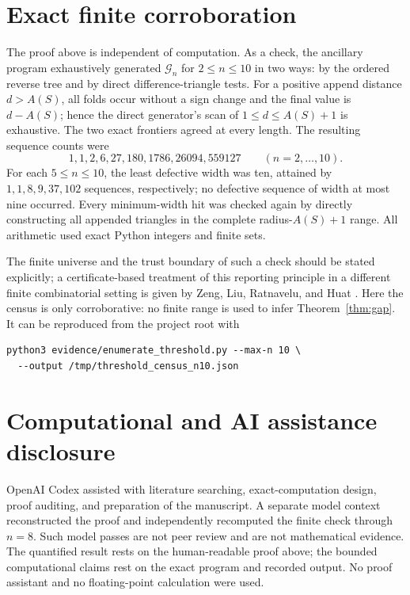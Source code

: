 \documentclass[11pt]{article}
\theoremstyle{remark}
\newcommand{\G}{\mathcal G}
\begin{document}
\section{Exact finite corroboration}

The proof above is independent of computation.  As a check, the ancillary
program  exhaustively generated $\G_n$ for
$2\le n\le10$ in two ways: by the ordered reverse tree and by direct
difference-triangle tests.  For a positive append distance $d>A(S)$, all
folds occur without a sign change and the final value is $d-A(S)$; hence the
direct generator's scan of $1\le d\le A(S)+1$ is exhaustive.  The two exact
frontiers agreed at every length.  The resulting sequence counts were
\[
 1,1,2,6,27,180,1786,26094,559127
 \qquad(n=2,\ldots,10).
\]
For each $5\le n\le10$, the least defective width was ten, attained by
$1,1,8,9,37,102$ sequences, respectively; no defective sequence of width at
most nine occurred.  Every minimum-width hit was checked again by directly
constructing all appended triangles in the complete radius-$A(S)+1$ range.
All arithmetic used exact Python integers and finite sets.

The finite universe and the trust boundary of such a check should be stated
explicitly; a certificate-based treatment of this reporting principle in a
different finite combinatorial setting is given by Zeng, Liu, Ratnavelu, and
Huat \cite[Section~6]{ZengEtAl2026Certificates}.  Here the census is only
corroborative: no finite range is used to infer Theorem~\ref{thm:gap}.
It can be reproduced from the project root with
\begin{verbatim}
python3 evidence/enumerate_threshold.py --max-n 10 \
  --output /tmp/threshold_census_n10.json
\end{verbatim}

\section*{Computational and AI assistance disclosure}

OpenAI Codex assisted with literature searching, exact-computation design,
proof auditing, and preparation of the manuscript.  A separate model context
reconstructed the proof and independently recomputed the finite check through
$n=8$.  Such model passes are not peer review and are not mathematical
evidence.  The quantified result rests on the human-readable proof above;
the bounded computational claims rest on the exact program and recorded
output.  No proof assistant and no floating-point calculation were used.



\end{document}
